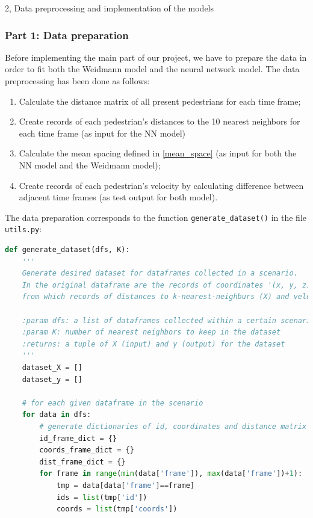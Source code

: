 \documentclass[10pt,a4paper]{article}
\begin{document}
\begin{task}{2, Data preprocessing and implementation of the models}

\subsubsection*{Part 1: Data preparation}

Before implementing the main part of our project, we have to prepare the data in order to fit both the Weidmann model and the neural network model. The data preprocessing has been done as follows:
\begin{enumerate}
    \item Calculate the distance matrix of all present pedestrians for each time frame;
    \item Create records of each pedestrian's distances to the 10 nearest neighbors for each time frame (as input for the NN model)
    \item Calculate the mean spacing defined in \eqref{mean_space} (as input for both the NN model and the Weidmann model);
    \item Create records of each pedestrian’s velocity by calculating difference between adjacent time frames (as test output for both model).
\end{enumerate}

The data preparation corresponds to the function \texttt{generate\_dataset()} in the file \texttt{utils.py}:
\begin{lstlisting}[language=Python]
def generate_dataset(dfs, K):
    '''
    Generate desired dataset for dataframes collected in a scenario.
    In the original dataframe are the records of coordinates '(x, y, z)' for each pedestrians on different time frames, 
    from which records of distances to k-nearest-neighburs (X) and velocity (y) could be calculated.

    :param dfs: a list of dataframes collected within a certain scenario
    :param K: number of nearest neighbors to keep in the dataset
    :returns: a tuple of X (input) and y (output) for the dataset
    '''
    dataset_X = []
    dataset_y = []

    # for each given dataframe in the scenario
    for data in dfs:
        # generate dictionaries of id, coordinates and distance matrix on each time frame 
        id_frame_dict = {}
        coords_frame_dict = {}
        dist_frame_dict = {}
        for frame in range(min(data['frame']), max(data['frame'])+1):
            tmp = data[data['frame']==frame]
            ids = list(tmp['id'])
            coords = list(tmp['coords'])
            

\end{lstlisting}
\end{task}
\end{document}
